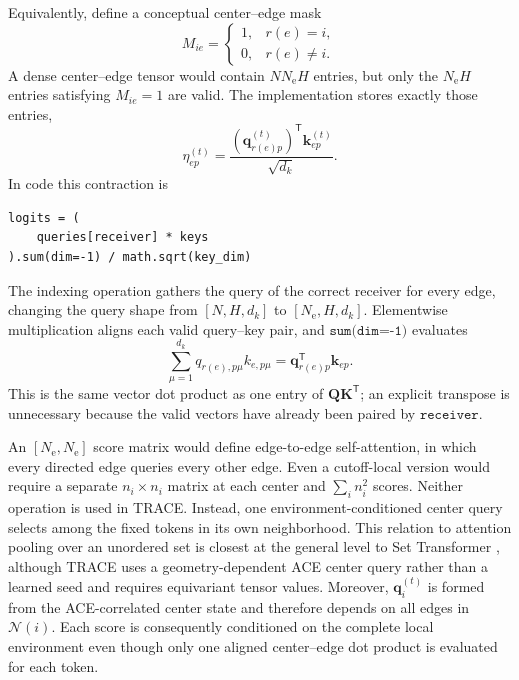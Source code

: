\documentclass[aps,prx,preprint,notitlepage,superscriptaddress,nofootinbib,floatfix]{revtex4-2}
\newcommand{\vect}[1]{\bm{#1}}
\newif\ifshowrevisions
\newenvironment{draftthirtyoneblock}
  {\ifshowrevisions\color{draftthirtyonecolor}\fi}
  {}
\begin{document}
\begin{draftthirtyoneblock}
Equivalently, define a conceptual center--edge mask
\begin{equation}
 M_{ie}=
 \begin{cases}
 1,&r(e)=i,\\
 0,&r(e)\ne i.
 \end{cases}
 \label{eq:app-incidence-mask}
\end{equation}
A dense center--edge tensor would contain \(NN_{\mathrm e}H\) entries, but
only the \(N_{\mathrm e}H\) entries satisfying \(M_{ie}=1\) are valid. The
implementation stores exactly those entries,
\begin{equation}
 \eta_{ep}^{(t)}
 =
 \frac{
 (\vect q_{r(e)p}^{(t)})^{\mathsf T}\vect k_{ep}^{(t)}
 }{\sqrt{d_k}} .
 \label{eq:app-sparse-dot}
\end{equation}
In code this contraction is
\begin{verbatim}
logits = (
    queries[receiver] * keys
).sum(dim=-1) / math.sqrt(key_dim)
\end{verbatim}
The indexing operation gathers the query of the correct receiver for every
edge, changing the query shape from \([N,H,d_k]\) to
\([N_{\mathrm e},H,d_k]\). Elementwise multiplication aligns each valid
query--key pair, and \(\texttt{sum(dim=-1)}\) evaluates
\begin{equation}
 \sum_{\mu=1}^{d_k}q_{r(e),p\mu}k_{e,p\mu}
 =\vect q_{r(e)p}^{\mathsf T}\vect k_{ep}.
 \label{eq:app-code-dot}
\end{equation}
This is the same vector dot product as one entry of
\(\vect Q\vect K^{\mathsf T}\); an explicit transpose is unnecessary because
the valid vectors have already been paired by \(\texttt{receiver}\).

An \([N_{\mathrm e},N_{\mathrm e}]\) score matrix would define edge-to-edge
self-attention, in which every directed edge queries every other edge. Even a
cutoff-local version would require a separate \(n_i\times n_i\) matrix at
each center and \(\sum_i n_i^2\) scores. Neither operation is used in TRACE.
Instead, one environment-conditioned center query selects among the fixed
tokens in its own neighborhood. This relation to attention pooling over an
unordered set is closest at the general level to Set Transformer
\cite{lee2019set}, although TRACE uses a geometry-dependent ACE center query
rather than a learned seed and requires equivariant tensor values. Moreover,
\(\vect q_i^{(t)}\) is formed from the ACE-correlated center state and
therefore depends on all edges in \(\mathcal N(i)\). Each score is consequently
conditioned on the complete local environment even though only one aligned
center--edge dot product is evaluated for each token.


\end{draftthirtyoneblock}
\end{document}
